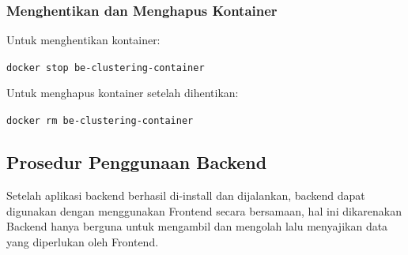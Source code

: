 \documentclass{article}
\newcommand{\inlinecode}[1]{%
    \begin{mdframed}[style=codestyle]
    \texttt{\small #1}
    \end{mdframed}
}
\begin{document}
    \subsubsection{Menghentikan dan Menghapus Kontainer}
    Untuk menghentikan kontainer:

    \inlinecode{docker stop be-clustering-container}
    Untuk menghapus kontainer setelah dihentikan:

    \inlinecode{docker rm be-clustering-container}

    \subsection{Prosedur Penggunaan Backend}
    Setelah aplikasi backend berhasil di-install dan dijalankan, backend dapat digunakan dengan menggunakan Frontend
    secara bersamaan, hal ini dikarenakan Backend hanya berguna untuk mengambil dan mengolah lalu menyajikan data
    yang diperlukan oleh Frontend.
\end{document}
